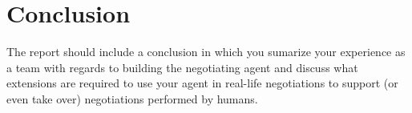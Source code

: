 \chapter*{Conclusion}

The report should include a conclusion in which you sumarize your experience as a team with regards to building the negotiating agent and discuss what extensions are required to use your agent in real-life negotiations to support (or even take over) negotiations performed by humans.